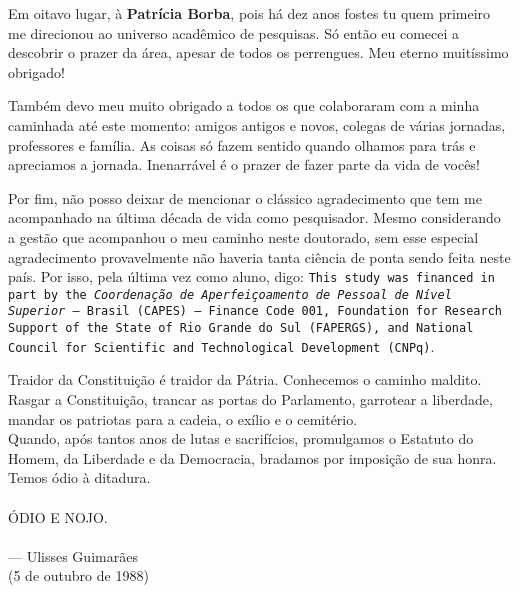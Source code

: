 \documentclass[tese,capa]{texufpel}
\begin{document}
\begin{agradecimentos}
Em oitavo lugar, à \textbf{Patrícia Borba}, pois há dez anos fostes tu quem primeiro me direcionou ao universo acadêmico de pesquisas. Só então eu comecei a descobrir o prazer da área, apesar de todos os perrengues. Meu eterno muitíssimo obrigado!
  
Também devo meu muito obrigado a todos os que colaboraram com a minha caminhada até este momento: amigos antigos e novos, colegas de várias jornadas, professores e família. As coisas só fazem sentido quando olhamos para trás e apreciamos a jornada. Inenarrável é o prazer de fazer parte da vida de vocês! 

Por fim, não posso deixar de mencionar o clássico agradecimento que tem me acompanhado na última década de vida como pesquisador. Mesmo considerando a gestão que acompanhou o meu caminho neste doutorado, sem esse especial agradecimento provavelmente não haveria tanta ciência de ponta sendo feita neste país. Por isso, pela última vez como aluno, digo: \texttt{This study was financed in part by the \textit{Coordenação de Aperfeiçoamento de Pessoal de Nível Superior} – Brasil (CAPES) – Finance Code 001, Foundation for Research Support of the State of Rio Grande do Sul (FAPERGS), and National Council for Scientific and Technological Development (CNPq)}.

\end{agradecimentos}


\begin{epigrafe}
Traidor da Constituição é traidor da Pátria. Conhecemos o caminho maldito. Rasgar a Constituição, trancar as portas do Parlamento, garrotear a liberdade, mandar os patriotas para a cadeia, o exílio e o cemitério. \\
Quando, após tantos anos de lutas e sacrifícios, promulgamos o Estatuto do Homem, da Liberdade e da Democracia, bradamos por imposição de sua honra. \\
Temos ódio à ditadura. \\
\\
ÓDIO E NOJO. \\
\\
{\sc --- Ulisses Guimarães\\
(5 de outubro de 1988)}
\end{epigrafe}
\end{document}
